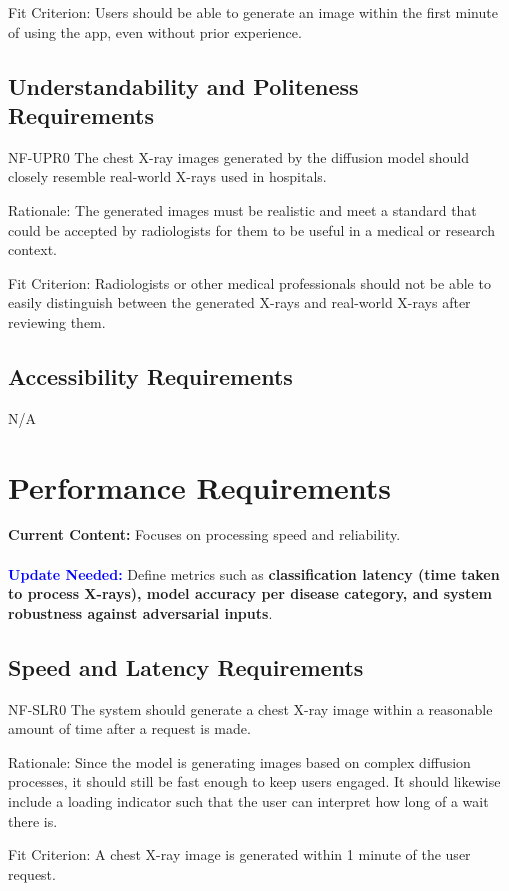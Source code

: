 \documentclass[12pt]{article}
\begin{document}
Fit Criterion: Users should be able to generate an image within the first minute of using the app, even without prior experience.

\subsection{Understandability and Politeness Requirements}
NF-UPR0 The chest X-ray images generated by the diffusion model should closely resemble real-world 
X-rays used in hospitals.

Rationale: The generated images must be realistic and meet a standard that could be accepted by 
radiologists for them to be useful in a medical or research context.

Fit Criterion: Radiologists or other medical professionals should not be able to easily 
distinguish between the generated X-rays and real-world X-rays after reviewing them.

\subsection{Accessibility Requirements}
N/A

\section{Performance Requirements}

\textbf{Current Content:} Focuses on processing speed and reliability. \\
\\
\textbf{\textcolor{blue}{Update Needed:}} Define metrics such as \textbf{classification latency (time taken to process X-rays), model accuracy per disease category, and system robustness against adversarial inputs}.

\subsection{Speed and Latency Requirements}
NF-SLR0 The system should generate a chest X-ray image within a reasonable amount of time after a 
request is made.

Rationale: Since the model is generating images based on complex diffusion processes, it should 
still be fast enough to keep users engaged. It should likewise include a loading indicator such 
that the user can interpret how long of a wait there is.

Fit Criterion: A chest X-ray image is generated within 1 minute of the user request.
\end{document}
